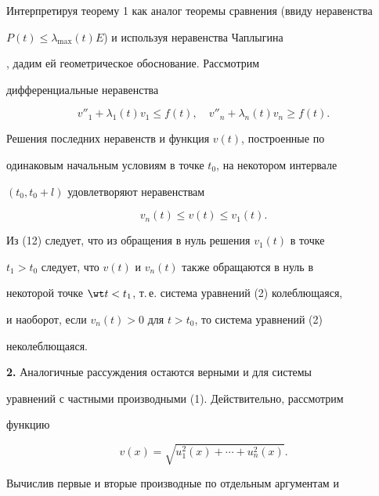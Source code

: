 


\begin{note} 


Интерпретируя теорему 1 как аналог теоремы сравнения (ввиду неравенства 


$P(t)\le\lambda_{\max}(t)E$) и используя неравенства Чаплыгина 


\cite{4}, дадим ей геометрическое обоснование. Рассмотрим 


дифференциальные неравенства 


$$ 


v''_1+\lambda_1(t)v_1\le f(t),\quad 


v''_n+\lambda_n(t)v_n\ge f(t). 


$$ 


Решения последних неравенств и функция $v(t)$, построенные по 


одинаковым начальным условиям в точке $t_0$, на некотором интервале 


$(t_0,t_0+l)$ удовлетворяют неравенствам 


\begin{equation} 


v_n(t)\le v(t)\le v_1(t). 


\end{equation} 


 


Из (12) следует, что из обращения в нуль решения $v_1(t)$ в точке 


$t_1>t_0$ следует, что $v(t)$ и $v_n(t)$ также обращаются в нуль в 


некоторой точке $\wt t<t_1$, т.\,е. система уравнений (2) колеблющаяся, 


и наоборот, если $v_n(t)>0$ для $t>t_0$, то система уравнений (2) 


неколеблющаяся. 


\end{note} 


 


{\bf 2.} Аналогичные рассуждения остаются верными и для системы 


уравнений с частными производными (1). Действительно, рассмотрим 


функцию 


$$ 


v(x)=\sqrt{u^2_1(x)+\dotsb+u^2_n(x)}. 


$$ 


Вычислив первые и вторые производные по отдельным аргументам и 



